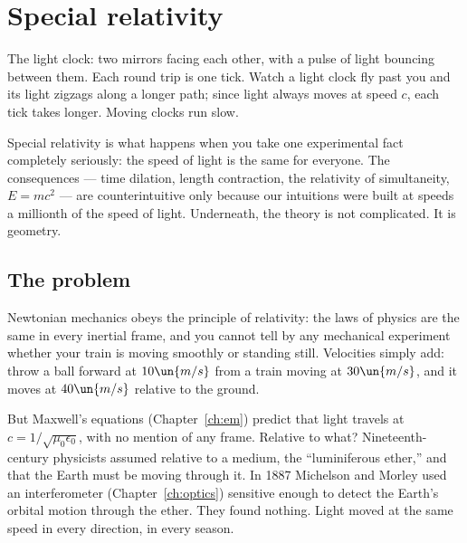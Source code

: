 \chapter{Special relativity}
\label{ch:sr}



\begin{prototype}
The light clock: two mirrors facing each other, with a pulse of light bouncing between them. Each round trip is one tick. Watch a light clock fly past you and its light zigzags along a longer path; since light always moves at speed $c$, each tick takes longer. Moving clocks run slow.
\end{prototype}

Special relativity is what happens when you take one experimental fact completely seriously: the speed of light is the same for everyone. The consequences --- time dilation, length contraction, the relativity of simultaneity, $E=mc^2$ --- are counterintuitive only because our intuitions were built at speeds a millionth of the speed of light. Underneath, the theory is not complicated. It is geometry.

\section{The problem}

Newtonian mechanics obeys the principle of relativity: the laws of physics are the same in every inertial frame, and you cannot tell by any mechanical experiment whether your train is moving smoothly or standing still. Velocities simply add: throw a ball forward at $10\un{m/s}$ from a train moving at $30\un{m/s}$, and it moves at $40\un{m/s}$ relative to the ground.

But Maxwell's equations (Chapter~\ref{ch:em}) predict that light travels at $c = 1/\sqrt{\mu_0\epsilon_0}$, with no mention of any frame. Relative to what? Nineteenth-century physicists assumed relative to a medium, the ``luminiferous ether,'' and that the Earth must be moving through it. In 1887 Michelson and Morley used an interferometer (Chapter~\ref{ch:optics}) sensitive enough to detect the Earth's orbital motion through the ether. They found nothing. Light moved at the same speed in every direction, in every season.

